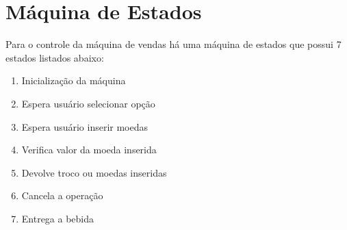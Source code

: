 %
%
%
%
%

%
%
%
%
%

\section{Máquina de Estados} \label{sec:state_machine}

Para o controle da máquina de vendas há uma máquina de estados que possui 7 estados listados abaixo:

\begin{enumerate}
    \item Inicialização da máquina
    \item Espera usuário selecionar opção
    \item Espera usuário inserir moedas
    \item Verifica valor da moeda inserida
    \item Devolve troco ou moedas inseridas
    \item Cancela a operação
    \item Entrega a bebida
\end{enumerate}

